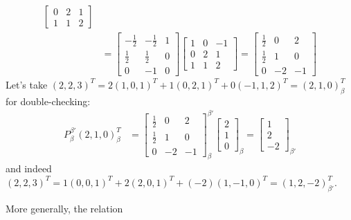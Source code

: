 \begin{solution}
\begin{align*}
\begin{bmatrix}
0 & 2 & 1 \\
1 & 1 & 2
\end{bmatrix} \\
&=
\begin{bmatrix}
-\frac{1}{2} & -\frac{1}{2} & 1 \\
\frac{1}{2} & \frac{1}{2} & 0 \\
0 & -1 & 0
\end{bmatrix}
\begin{bmatrix}
1 & 0 & -1\\
0 & 2 & 1 \\
1 & 1 & 2
\end{bmatrix}
=
\begin{bmatrix}
\frac{1}{2} & 0 & 2 \\
\frac{1}{2} & 1 & 0 \\
0 & -2 & -1
\end{bmatrix}
\end{align*}
Let's take $(2,2,3)^T = 2(1,0,1)^T + 1(0,2,1)^T + 0(-1,1,2)^T = (2,1,0)^T_\beta$ for double-checking:
\begin{align*}
P_\beta^{\beta'}(2,1,0)^T_\beta &= 
\begin{bmatrix}
\frac{1}{2} & 0 & 2 \\
\frac{1}{2} & 1 & 0 \\
0 & -2 & -1
\end{bmatrix}_\beta^{\beta'}
\begin{bmatrix}
2 \\
1 \\
0
\end{bmatrix}_\beta
=
\begin{bmatrix}
1 \\
2 \\
-2
\end{bmatrix}_{\beta'}
\end{align*}
and indeed $(2,2,3)^T = 1(0,0,1)^T + 2(2,0,1)^T + (-2)(1,-1,0)^T = (1,2,-2)^T_{\beta'}$.
\end{solution}
More generally, the relation
